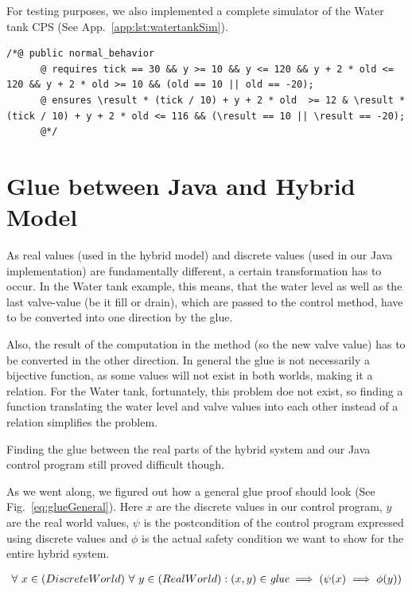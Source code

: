 For testing purposes, we also implemented a complete simulator of the Water tank CPS (See App.~\ref{app:lst:watertankSim}).

\begin{lstlisting}[label=lst:JDL]
	/*@ public normal_behavior 
	  @ requires tick == 30 && y >= 10 && y <= 120 && y + 2 * old <= 120 && y + 2 * old >= 10 && (old == 10 || old == -20);
	  @ ensures \result * (tick / 10) + y + 2 * old  >= 12 & \result * (tick / 10) + y + 2 * old <= 116 && (\result == 10 || \result == -20); 
	  @*/
\end{lstlisting} 

\section{Glue between Java and Hybrid Model}
\label{sec:Watertank:Glue}

As real values (used in the hybrid model) and discrete values (used in our Java implementation) are fundamentally different, a certain transformation has to occur.  In the Water tank example, this means, that the water level as well as the last valve-value (be it fill or drain), which are passed to the control method, have to be converted into one direction by the glue. 

Also, the result of the computation in the method (so the new valve value) has to be converted in the other direction. In general the glue is not necessarily a bijective function, as some values will not exist in both worlds, making it a relation. For the Water tank, fortunately, this problem doe not exist, so finding a function translating the water level and valve values into each other instead of a relation simplifies the problem.

Finding the glue between the real parts of the hybrid system and our Java control program still proved difficult though.

As we went along, we figured out how a general glue proof should look (See Fig.~\ref{eq:glueGeneral}). Here \(x\) are the discrete values in our control program, \(y\) are the real world values, \(\psi\) is the postcondition of the control program expressed using discrete values and \(\phi\) is the actual safety condition we want to show for the entire hybrid system.

\begin{equation}
	\centering
	\begin{split}
		\forall~x \in (Discrete World)~\forall~y \in (Real World):(x,y) \in \textit{glue} \implies (\psi(x) \implies \phi(y))
	\end{split}
	\label{eq:glueGeneral}
\end{equation}

